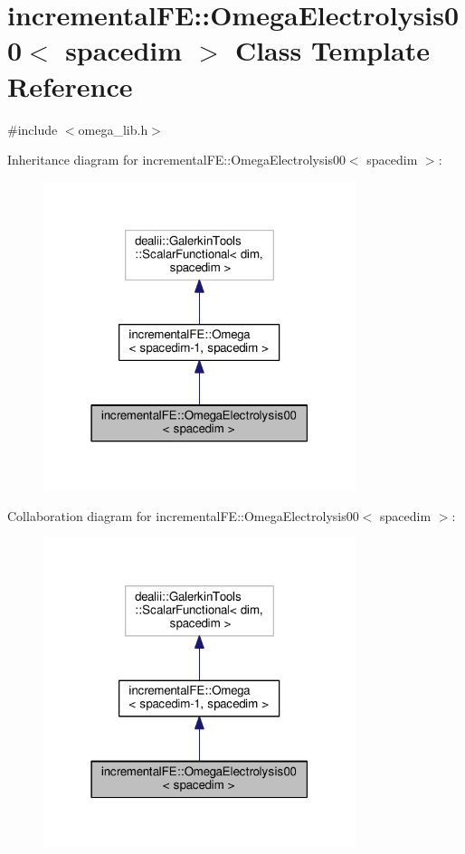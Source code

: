 \hypertarget{classincremental_f_e_1_1_omega_electrolysis00}{}\section{incremental\+FE\+:\+:Omega\+Electrolysis00$<$ spacedim $>$ Class Template Reference}
\label{classincremental_f_e_1_1_omega_electrolysis00}


{\ttfamily \#include $<$omega\+\_\+lib.\+h$>$}



Inheritance diagram for incremental\+FE\+:\+:Omega\+Electrolysis00$<$ spacedim $>$\+:\nopagebreak
\begin{figure}[H]
\begin{center}
\leavevmode
\includegraphics[width=259pt]{classincremental_f_e_1_1_omega_electrolysis00__inherit__graph}
\end{center}
\end{figure}


Collaboration diagram for incremental\+FE\+:\+:Omega\+Electrolysis00$<$ spacedim $>$\+:\nopagebreak
\begin{figure}[H]
\begin{center}
\leavevmode
\includegraphics[width=259pt]{classincremental_f_e_1_1_omega_electrolysis00__coll__graph}
\end{center}
\end{figure}
